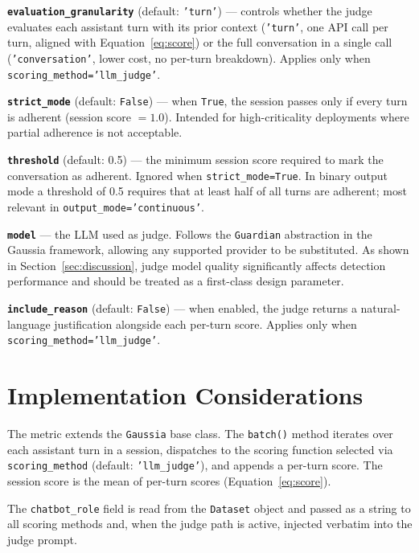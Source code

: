 \documentclass[11pt,a4paper]{article}
\begin{document}
\textbf{\texttt{evaluation\_granularity}} (default: \texttt{'turn'}) ---
controls whether the judge evaluates each assistant turn with its prior
context (\texttt{'turn'}, one API call per turn, aligned with
Equation~\ref{eq:score}) or the full conversation in a single call
(\texttt{'conversation'}, lower cost, no per-turn breakdown). Applies only
when \texttt{scoring\_method='llm\_judge'}.

\textbf{\texttt{strict\_mode}} (default: \texttt{False}) --- when
\texttt{True}, the session passes only if every turn is adherent (session
score $= 1.0$). Intended for high-criticality deployments where partial
adherence is not acceptable.

\textbf{\texttt{threshold}} (default: 0.5) --- the minimum session score
required to mark the conversation as adherent. Ignored when
\texttt{strict\_mode=True}. In binary output mode a threshold of 0.5
requires that at least half of all turns are adherent; most relevant in
\texttt{output\_mode='continuous'}.

\textbf{\texttt{model}} --- the LLM used as judge. Follows the
\texttt{Guardian} abstraction in the Gaussia framework, allowing any
supported provider to be substituted. As shown in Section~\ref{sec:discussion},
judge model quality significantly affects detection performance and should
be treated as a first-class design parameter.

\textbf{\texttt{include\_reason}} (default: \texttt{False}) --- when
enabled, the judge returns a natural-language justification alongside each
per-turn score. Applies only when \texttt{scoring\_method='llm\_judge'}.

\section{Implementation Considerations}

The metric extends the \texttt{Gaussia} base class. The \texttt{batch()}
method iterates over each assistant turn in a session, dispatches to the
scoring function selected via \texttt{scoring\_method} (default:
\texttt{'llm\_judge'}), and appends a per-turn score. The session score is
the mean of per-turn scores (Equation~\ref{eq:score}).

The \texttt{chatbot\_role} field is read from the \texttt{Dataset} object
and passed as a string to all scoring methods and, when the judge path is
active, injected verbatim into the judge prompt.
\end{document}

